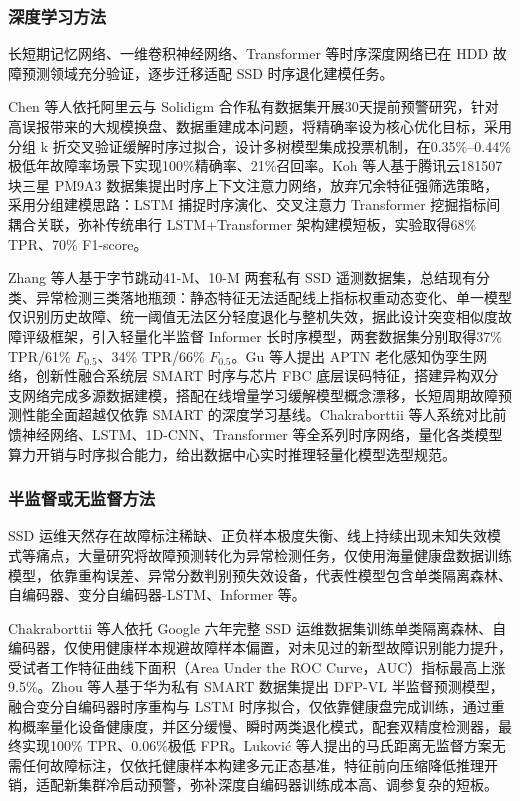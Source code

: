 \subsubsection{深度学习方法}
长短期记忆网络、一维卷积神经网络、Transformer 等时序深度网络已在 HDD 故障预测领域充分验证，逐步迁移适配 SSD 时序退化建模任务\cite{lu2020making,luo2021ntam, vaswani2017attention}。

Chen 等人依托阿里云与 Solidigm 合作私有数据集开展30天提前预警研究，针对高误报带来的大规模换盘、数据重建成本问题，将精确率设为核心优化目标，采用分组 k 折交叉验证缓解时序过拟合，设计多树模型集成投票机制，在0.35\%–0.44\%极低年故障率场景下实现100\%精确率、21\%召回率\cite{chen2022ssd}。Koh 等人基于腾讯云181507块三星 PM9A3 数据集提出时序上下文注意力网络，放弃冗余特征强筛选策略，采用分组建模思路：LSTM 捕捉时序演化、交叉注意力 Transformer 挖掘指标间耦合关联，弥补传统串行 LSTM+Transformer 架构建模短板，实验取得68\% TPR、70\% F1-score\cite{koh2024temporal}。

Zhang 等人基于字节跳动41-M、10-M 两套私有 SSD 遥测数据集，总结现有分类、异常检测三类落地瓶颈：静态特征无法适配线上指标权重动态变化、单一模型仅识别历史故障、统一阈值无法区分轻度退化与整机失效，据此设计突变相似度故障评级框架，引入轻量化半监督 Informer 长时序模型，两套数据集分别取得37\% TPR/61\% $F_{0.5}$、34\% TPR/66\% $F_{0.5}$\cite{zhang2024msfrd,zhou2021informer}。Gu 等人提出 APTN 老化感知伪孪生网络，创新性融合系统层 SMART 时序与芯片 FBC 底层误码特征，搭建异构双分支网络完成多源数据建模，搭配在线增量学习缓解模型概念漂移，长短周期故障预测性能全面超越仅依靠 SMART 的深度学习基线\cite{gu2024exploit}。Chakraborttii 等人系统对比前馈神经网络、LSTM、1D-CNN、Transformer 等全系列时序网络，量化各类模型算力开销与时序拟合能力，给出数据中心实时推理轻量化模型选型规范\cite{chakraborttii2026failure}。

\subsubsection{半监督或无监督方法}
SSD 运维天然存在故障标注稀缺、正负样本极度失衡、线上持续出现未知失效模式等痛点，大量研究将故障预测转化为异常检测任务，仅使用海量健康盘数据训练模型，依靠重构误差、异常分数判别预失效设备，代表性模型包含单类隔离森林、自编码器、变分自编码器-LSTM、Informer 等\cite{jiang2019lifelong,chakraborttii2020improving,zhang2024msfrd}。

Chakraborttii 等人依托 Google 六年完整 SSD 运维数据集训练单类隔离森林、自编码器，仅使用健康样本规避故障样本偏置，对未见过的新型故障识别能力提升，受试者工作特征曲线下面积（Area Under the ROC Curve，AUC）指标最高上涨9.5\%\cite{chakraborttii2020improving}。Zhou 等人基于华为私有 SMART 数据集提出 DFP-VL 半监督预测模型，融合变分自编码器时序重构与 LSTM 时序拟合，仅依靠健康盘完成训练，通过重构概率量化设备健康度，并区分缓慢、瞬时两类退化模式，配套双精度检测器，最终实现100\% TPR、0.06\%极低 FPR\cite{zhou2023proactive}。Lukovi\'c 等人提出的马氏距离无监督方案无需任何故障标注，仅依托健康样本构建多元正态基准，特征前向压缩降低推理开销，适配新集群冷启动预警，弥补深度自编码器训练成本高、调参复杂的短板\cite{lukovic2025solid}。

